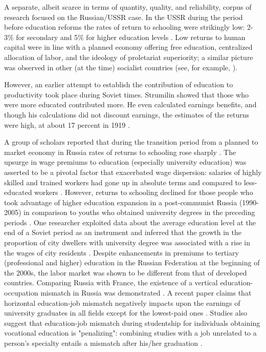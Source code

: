 \documentclass[alpha-refs]{wiley-article-01g}
\begin{document}
A separate, albeit scarce in terms of quantity, quality, and reliability, corpus of research focused on the Russian\slash USSR case. In the USSR during the period before education reforms the rates of return to schooling were strikingly low: 2-3\% for secondary and 5\% for higher education levels \parencite{Graeser1988}. Low returns to human capital were in line with a planned economy offering free education, centralized allocation of labor, and the ideology of proletariat superiority; a similar picture was observed in other (at the time) socialist countries (see, for example, \cite{Munich2005}).

However, an earlier attempt to establish the contribution of education to productivity took place during Soviet times. Strumilin showed that those who were more educated contributed more.  He even calculated earnings benefits, and though his calculations did not discount earnings, the estimates of the returns were high, at about 17 percent in 1919 \parencite{Strumilin1924}. 

A group of scholars reported that during the transition period from a planned to market economy in Russia rates of returns to schooling rose sharply \parencite{Brainerd1998,Clark2003,Vernon2002}. The upsurge in wage premiums to education (especially university education) was asserted to be a pivotal factor that exacerbated wage dispersion: salaries of highly skilled and trained workers had gone up in absolute terms and compared to less-educated workers \parencite{Fleisher2005}. However, returns to schooling declined for those people who took advantage of higher education expansion in a post-communist Russia (1990-2005) in comparison to youths who obtained university degrees in the preceding periods \parencite{Kyui2016}. One researcher exploited data about the average education level at the end of a Soviet period as an instrument and inferred that the growth in the proportion of city dwellers with university degree was associated with a rise in the wages of  city residents \parencite{ Muravyev2008}.
Despite enhancements in premiums to tertiary (professional and higher) education in the Russian Federation at the beginning of the 2000s, the labor market was shown to be different from that of developed countries. Comparing Russia with France, the existence of a vertical education-occupation mismatch in Russia was demonstrated \parencite{Kyui2010}. A recent paper claims that horizontal education-job mismatch negatively impacts upon the earnings of university graduates in all fields except for the lowest-paid ones \parencite{Rudakov2019}. Studies also suggest that education-job mismatch during studentship for individuals obtaining vocational education is "penalizing": combining studies with a job unrelated to a person's specialty entails a mismatch after his/her graduation \parencite{Dudyrev2018}.
\end{document}
